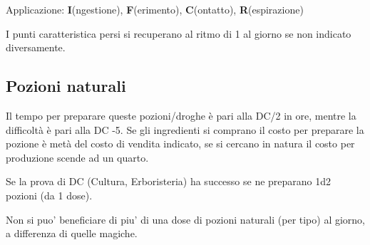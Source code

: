\documentclass[a4paper,11pt,twoside,openany]{book}
\begin{document}
Applicazione: \textbf{I}(ngestione), \textbf{F}(erimento),  \textbf{C}(ontatto), \textbf{R}(espirazione)
\bigskip

I punti caratteristica persi si recuperano al ritmo di 1 al giorno se non indicato diversamente.

\pagebreak

\subsection{Pozioni naturali}

Il tempo per preparare queste pozioni/droghe è pari alla DC/2 in ore, mentre la difficoltà è pari alla DC -5. Se gli ingredienti si comprano il costo per preparare la pozione è metà del costo di vendita indicato, se si cercano in natura il costo per produzione scende ad un quarto.

Se la prova di DC (Cultura, Erboristeria) ha successo se ne preparano 1d2 pozioni (da 1 dose).

Non si puo' beneficiare di piu' di una dose di pozioni naturali (per tipo) al giorno, a differenza di quelle magiche.

\bigskip
\end{document}
